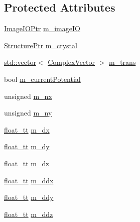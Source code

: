 \subsection*{Protected Attributes}
\begin{DoxyCompactItemize}
\item 
\hyperlink{namespace_q_s_t_e_m_a4983475ef18f1a1f4bbfaabb6d187b9a}{Image\-I\-O\-Ptr} \hyperlink{class_q_s_t_e_m_1_1_c_potential_a09c896379526b58852fe858eb4e4e7de}{m\-\_\-image\-I\-O}
\item 
\hyperlink{namespace_q_s_t_e_m_a7ab0b6bb11e12c9829540e6d872946fc}{Structure\-Ptr} \hyperlink{class_q_s_t_e_m_1_1_c_potential_ac8dff71355c172835edb00493b39fe91}{m\-\_\-crystal}
\item 
\hyperlink{qmb_8m_af54b69a32590de218622e869b06b47b3}{std\-::vector}$<$ \hyperlink{namespace_q_s_t_e_m_af210a2c1f9afae1deed746dcd9276221}{Complex\-Vector} $>$ \hyperlink{class_q_s_t_e_m_1_1_c_potential_adb76672fc393aeac0f027e44b48715f8}{m\-\_\-trans}
\item 
bool \hyperlink{class_q_s_t_e_m_1_1_c_potential_ae2ca76e0f9d7815bb38a08205dccbc08}{m\-\_\-current\-Potential}
\item 
unsigned \hyperlink{class_q_s_t_e_m_1_1_c_potential_a88fc2e25a5ddef36c47687f16de05669}{m\-\_\-nx}
\item 
unsigned \hyperlink{class_q_s_t_e_m_1_1_c_potential_af6331a7642e0a68107e0ca8ebafe8b7b}{m\-\_\-ny}
\item 
\hyperlink{namespace_q_s_t_e_m_a915d7caa497280d9f927c4ce8d330e47}{float\-\_\-tt} \hyperlink{class_q_s_t_e_m_1_1_c_potential_a58336777f207d02381649b1e237932b3}{m\-\_\-dx}
\item 
\hyperlink{namespace_q_s_t_e_m_a915d7caa497280d9f927c4ce8d330e47}{float\-\_\-tt} \hyperlink{class_q_s_t_e_m_1_1_c_potential_a892a80bbf826db4b7dbc94ca530e21c4}{m\-\_\-dy}
\item 
\hyperlink{namespace_q_s_t_e_m_a915d7caa497280d9f927c4ce8d330e47}{float\-\_\-tt} \hyperlink{class_q_s_t_e_m_1_1_c_potential_a81ca8793cb539766b1664be49cd56f14}{m\-\_\-dz}
\item 
\hyperlink{namespace_q_s_t_e_m_a915d7caa497280d9f927c4ce8d330e47}{float\-\_\-tt} \hyperlink{class_q_s_t_e_m_1_1_c_potential_abe22d3972e48e00a1ff33f70eb534bbd}{m\-\_\-ddx}
\item 
\hyperlink{namespace_q_s_t_e_m_a915d7caa497280d9f927c4ce8d330e47}{float\-\_\-tt} \hyperlink{class_q_s_t_e_m_1_1_c_potential_a73a0df1661f8e668b34b87c71c85d538}{m\-\_\-ddy}
\item 
\hyperlink{namespace_q_s_t_e_m_a915d7caa497280d9f927c4ce8d330e47}{float\-\_\-tt} \hyperlink{class_q_s_t_e_m_1_1_c_potential_a6e750dc3651ffd4e2580667d14ec1b29}{m\-\_\-ddz}

\end{DoxyCompactItemize}
